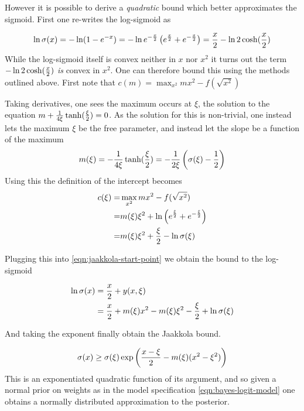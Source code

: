 However it is possible to derive a \emph{quadratic} bound which better approximates the sigmoid. First one re-writes the log-sigmoid as

\begin{equation}
\ln \sigma(x) = -\ln (1 - e^{-x}) = -\ln e^{-\frac{x}{2}} \left( e^{\frac{x}{2}} + e^{-\frac{x}{2}} \right) = \frac{x}{2} - \ln 2 \cosh (\frac{x}{2}) \label{eqn:jaakkola-start-point}
\end{equation}
 While the log-sigmoid itself is convex neither in $x$ nor $x^2$ it turns out the term $- \ln 2 \cosh (\frac{x}{2})$ \emph{is} convex in $x^2$. One can therefore bound this using the methods outlined above. First note that $c(m) = \max_{x^2} mx^2 - f(\sqrt{x^2})$ 

Taking derivatives, one sees the maximum occurs at $\xi$, the solution to the equation $m + \frac{1}{4 \xi} \tanh (\frac{\xi}{2}) = 0$. As the solution for this is non-trivial, one instead lets the maximum $\xi$ be the free parameter, and instead let the slope be a function of the maximum
\begin{align}
m(\xi) = -\frac{1}{4\xi} \tanh (\frac{\xi}{2}) = -\frac{1}{2\xi} \left(\sigma(\xi) - \frac{1}{2}\right)
\end{align}
Using this the definition of the intercept becomes
\begin{align}
\begin{split}
c(\xi) = & \max_{x^2} mx^2 - f(\sqrt{x^2}) \\
 = & m(\xi)\xi^2 + \ln \left(e^{\frac{\xi}{2}} + e^{-\frac{\xi}{2}} \right) \\
 = & m(\xi)\xi^2 + \frac{\xi}{2} - \ln \sigma (\xi)
\end{split}
\end{align}


Plugging this into \eqref{eqn:jaakkola-start-point} we obtain the bound to the log-sigmoid

\begin{align}
\begin{split}
\ln \sigma(x) & = \frac{x}{2} + y(x, \xi) \\
 & = \frac{x}{2} + m(\xi)x^2 - m(\xi)\xi^2 - \frac{\xi}{2} + \ln \sigma(\xi)
\end{split}
\end{align}

And taking the exponent finally obtain the Jaakkola\cite{Jaakkola1997} bound.

\begin{align}
\sigma(x) \geq \sigma(\xi)\exp \left(\frac{x - \xi}{2} - m(\xi)(x^2 - \xi^2) \right)
\end{align}
This is an exponentiated quadratic function of its argument, and so given a normal prior on weights as in the model specification \eqref{eqn:bayes-logit-model} one obtains a normally distributed approximation to the posterior.

